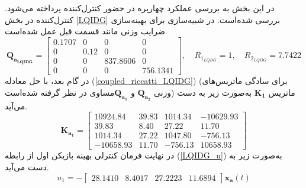 

 در این بخش به بررسی عملکرد چهارپره در حضور کنترل‌کننده  پرداخته می‌شود. کنترل‌کننده  در بخش
\ref{LQIDG}
بررسی شده‌است.
 در شبیه‌سازی برای بهینه‌سازی ضرایب وزنی مانند قسمت قبل عمل شده‌است.
\begin{equation}
	\boldsymbol{Q_{a_{LQIDG}}} = \begin{bmatrix}
		0.1707 &0& 0& 0\\
		0 &  0.12 & 0 &0 \\
		0 & 0 & 837.8606 & 0\\
		0 & 0 & 0 & 756.1341
	\end{bmatrix}, \quad R_{1_{LQDG}} =  1, \quad R_{2_{LQDG}} =  7.7422
\end{equation}
در گام بعد، با حل معادله
(\ref{coupled_riccatti_LQIDG})
(برای سادگی ماتریس‌های وزنی $\boldsymbol{{Q}_{a_2}}$ و $\boldsymbol{{Q}_{a_1}}$مساوی در نظر گرفته شده‌است)
ماتریس
$\boldsymbol{{K}_1}$
به‌صورت زیر به دست می‌آید.
\begin{equation}
	\boldsymbol{K_{a_1}} = \begin{bmatrix}
		10924.84&   39.83 & 1014.34 & -10629.93\\
		39.83   &  8.40 & 27.22& 11.70\\
		1014.34 &  27.22 & 1047.80 & -756.13\\
		-10658.93 & 11.70 & -756.13 & 10658.93
	\end{bmatrix}
\end{equation}
در نهایت فرمان کنترلی بهینه بازیکن اول از رابطه
(\ref{LQIDG_u})
به‌صورت زیر به دست می‌آید.
\begin{equation}
	u_1 = -\begin{bmatrix}
		28.1410 &   8.4017  & 27.2223  & 11.6894
	\end{bmatrix}\boldsymbol{x_{a}}(t)
\end{equation}

